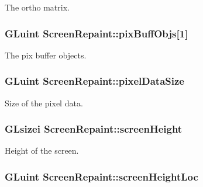 The ortho matrix. \hypertarget{class_screen_repaint_aed1d40b65dbb7b8fce5f8338c1900166}{
\subsubsection[{pix\-Buff\-Objs}]{\setlength{\rightskip}{0pt plus 5cm}G\-Luint {\bf Screen\-Repaint\-::pix\-Buff\-Objs}\mbox{[}1\mbox{]}}}\label{class_screen_repaint_aed1d40b65dbb7b8fce5f8338c1900166}
The pix buffer objects. \hypertarget{class_screen_repaint_a4b009b422686af9594c19c777529ea49}{
\subsubsection[{pixel\-Data\-Size}]{\setlength{\rightskip}{0pt plus 5cm}G\-Luint {\bf Screen\-Repaint\-::pixel\-Data\-Size}}}\label{class_screen_repaint_a4b009b422686af9594c19c777529ea49}
Size of the pixel data. \hypertarget{class_screen_repaint_abac42d5d09d3f52c6e2567c524c03049}{
\subsubsection[{screen\-Height}]{\setlength{\rightskip}{0pt plus 5cm}G\-Lsizei {\bf Screen\-Repaint\-::screen\-Height}}}\label{class_screen_repaint_abac42d5d09d3f52c6e2567c524c03049}
Height of the screen. \hypertarget{class_screen_repaint_a18d8432e475280b99a2cdb5786129011}{
\subsubsection[{screen\-Height\-Loc}]{\setlength{\rightskip}{0pt plus 5cm}G\-Luint {\bf Screen\-Repaint\-::screen\-Height\-Loc}}}\label{class_screen_repaint_a18d8432e475280b99a2cdb5786129011}
